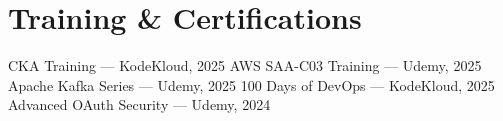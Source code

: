     


\section*{Training \& Certifications} 
\BigDivider 
\small \newline
CKA Training --- KodeKloud, 2025 \textbullet{} 
AWS SAA-C03 Training --- Udemy, 2025 \textbullet{} 
Apache Kafka Series --- Udemy, 2025 \textbullet{} 
100 Days of DevOps --- KodeKloud, 2025 \textbullet{} 
Advanced OAuth Security --- Udemy, 2024 
\normalsize 
